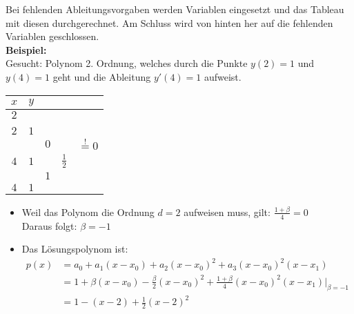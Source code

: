 Bei fehlenden Ableitungsvorgaben werden Variablen eingesetzt und das Tableau mit diesen durchgerechnet. Am Schluss wird von hinten her auf die fehlenden Variablen geschlossen.\\

\textbf{Beispiel:}\\
Gesucht: Polynom 2. Ordnung, welches durch die Punkte $y(2)=1$ und $y(4)=1$ geht und die Ableitung $y'(4)=1$ aufweist.

\begin{minipage}[c]{6cm}
	\renewcommand{\arraystretch}{1.0}
	\begin{tabular}{|c|llll|}
		\hline
		$x$	&\multicolumn{4}{l|}{$y$}\\
		\hline
		$2$	&\kreisS{$1$}{$a_0$}&	&&\\
			&	&\kreisS{$\beta$}{$a_1$}&&\\
		$2$	&$1$&	&\kreisB{$-\frac \beta2$}{$a_2$}&\\
			&	&$0$&				  &\kreisB{$\frac{1+\beta}{4}$}{$a_3$}$\overset{!}{=}0$\\
		$4$	&$1$&	&$\frac 12$&\\
			&	&$1$&&\\
		$4$	&$1$&	&&\\		
		\hline
	\end{tabular}
	\renewcommand{\arraystretch}{1.5}
\end{minipage}
\hfill
\begin{minipage}[c]{12cm}

	\vspace{0.5cm}
	
	\begin{itemize}
		\item Weil das Polynom die Ordnung $d=2$ aufweisen muss, gilt: $\frac{1+\beta}4=0$\\
		Daraus folgt: $\beta=-1$
		\item Das Lösungspolynom ist:
		\begin{align} p(x)&=a_0+a_1(x-x_0)+a_2(x-x_0)^2+a_3(x-x_0)^2(x-x_1)\nonumber\\
		&=1+\beta(x-x_0)-\frac \beta2(x-x_0)^2+\frac{1+\beta}4(x-x_0)^2(x-x_1)\big|_{\beta=-1}\nonumber\\
		&=1-(x-2)+\frac 12(x-2)^2\nonumber
		\end{align}
	\end{itemize}
\end{minipage}

\vfill
